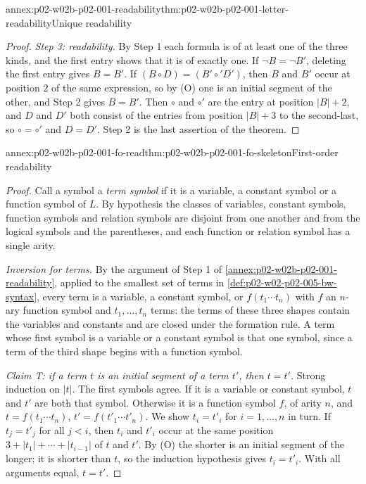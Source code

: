 \begin{annexitem}{annex:p02-w02b-p02-001-readability}{thm:p02-w02b-p02-001-letter-readability}{Unique readability}
\begin{proof}
\emph{Step 3: readability.}  By Step 1 each formula is of at least one of
the three kinds, and the first entry shows that it is of exactly one.  If
\(\neg B=\neg B'\), deleting the first entry gives \(B=B'\).  If
\((B\circ D)=(B'\circ'D')\), then \(B\) and \(B'\) occur at position \(2\)
of the same expression, so by (O) one is an initial segment of the other,
and Step 2 gives \(B=B'\).  Then \(\circ\) and \(\circ'\) are the entry at
position \(|B|+2\), and \(D\) and \(D'\) both consist of the entries from
position \(|B|+3\) to the second-last, so \(\circ=\circ'\) and \(D=D'\).
Step 2 is the last assertion of the theorem.
\end{proof}
\end{annexitem}

\begin{annexitem}{annex:p02-w02b-p02-001-fo-read}{thm:p02-w02b-p02-001-fo-skeleton}{First-order readability}
\begin{proof}
Call a symbol a \emph{term symbol} if it is a variable, a constant symbol
or a function symbol of \(L\).  By hypothesis the classes of variables,
constant symbols, function symbols and relation symbols are disjoint from
one another and from the logical symbols and the parentheses, and each
function or relation symbol has a single arity.

\emph{Inversion for terms.}  By the argument of Step 1 of
\cref{annex:p02-w02b-p02-001-readability}, applied to the smallest
set of terms in \cref{def:p02-w02-p02-005-bw-syntax}, every term is a variable, a constant symbol, or
\(f(t_1\cdots t_n)\) with \(f\) an \(n\)-ary function symbol and
\(t_1,\ldots,t_n\) terms: the terms of these three shapes contain the
variables and constants and are closed under the formation rule.  A term
whose first symbol is a variable or a constant symbol is that one symbol,
since a term of the third shape begins with a function symbol.

\emph{Claim T: if a term \(t\) is an initial segment of a term \(t'\), then
\(t=t'\).}  Strong induction on \(|t|\).  The first symbols agree.  If it
is a variable or constant symbol, \(t\) and \(t'\) are both that symbol.
Otherwise it is a function symbol \(f\), of arity \(n\), and
\(t=f(t_1\cdots t_n)\), \(t'=f(t'_1\cdots t'_n)\).  We show
\(t_i=t'_i\) for \(i=1,\ldots,n\) in turn.  If \(t_j=t'_j\) for all
\(j<i\), then \(t_i\) and \(t'_i\) occur at the same position
\(3+|t_1|+\cdots+|t_{i-1}|\) of \(t\) and \(t'\).  By (O) the shorter is an
initial segment of the longer; it is shorter than \(t\), so the induction
hypothesis gives \(t_i=t'_i\).  With all arguments equal, \(t=t'\).


\end{proof}
\end{annexitem}
